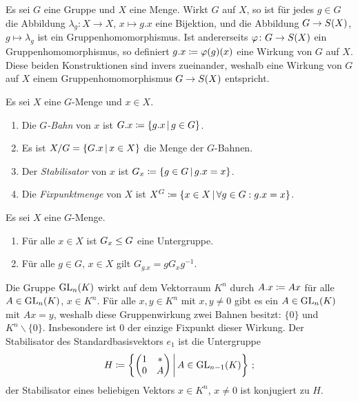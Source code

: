 Es sei $G$ eine Gruppe und $X$ eine Menge.
Wirkt $G$ auf $X$, so ist für jedes $g \in G$ die Abbildung $\lambda_g \colon X \to X$, $x \mapsto g.x$ eine Bijektion, und die Abbildung $G \to S(X)$, $g \mapsto \lambda_g$ ist ein Gruppenhomomorphismus.
Ist andererseits $\varphi \colon G \to S(X)$ ein Gruppenhomomorphismus, so definiert $g.x \coloneqq \varphi(g)(x)$ eine Wirkung von $G$ auf $X$.
Diese beiden Konstruktionen sind invers zueinander, weshalb eine Wirkung von $G$ auf $X$ einem Gruppenhomomorphismus $G \to S(X)$ entspricht.

\begin{definition}
  Es sei $X$ eine $G$-Menge und $x \in X$.
  \begin{enumerate}
    \item
      Die \emph{$G$-Bahn} von $x$ ist $G.x \defined \{g.x \suchthat g \in G\}$.
    \item
      Es ist $X/G = \{G.x \suchthat x \in X\}$ die Menge der $G$-Bahnen.
    \item
      Der \emph{Stabilisator} von $x$ ist $G_x \defined \{g \in G \suchthat g.x = x\}$.
    \item
      Die \emph{Fixpunktmenge} von $X$ ist $X^G \defined \{x \in X \suchthat \forall g \in G: g.x = x\}$.
  \end{enumerate}
\end{definition}

\begin{lemma}
  Es sei $X$ eine $G$-Menge.
  \begin{enumerate}
    \item
      Für alle $x \in X$ ist $G_x \mathrel{\leq} G$ eine Untergruppe.
    \item
      Für alle $g \in G$, $x \in X$ gilt $G_{g.x} = g G_x g^{-1}$.
  \end{enumerate}
\end{lemma}

\begin{example}
  Die Gruppe $\operatorname{GL}_{n}(K)$ wirkt auf dem Vektorraum $K^n$ durch $A.x \coloneqq Ax$ für alle $A \in \operatorname{GL}_{n}(K)$, $x \in K^n$.
  Für alle $x, y \in K^n$ mit $x, y \neq 0$ gibt es ein $A \in \operatorname{GL}_{n}(K)$ mit $Ax = y$, weshalb diese Gruppenwirkung zwei Bahnen besitzt:
  $\{0\}$ und $K^n \smallsetminus \{0\}$.
  Insbesondere ist $0$ der einzige Fixpunkt dieser Wirkung.
  Der Stabilisator des Standardbasisvektors $e_1$ ist die Untergruppe
  \[
              H
    \defined  \left\{
                \begin{pmatrix}
                  1 & * \\
                  0 & A
                \end{pmatrix}
              \suchthat*
                A \in \GL{n-1}{K}
              \right\} \,;
  \]
  der Stabilisator eines beliebigen Vektors $x \in K^n$, $x \neq 0$ ist konjugiert zu $H$.
\end{example}

